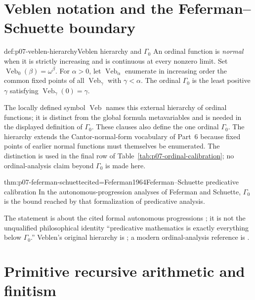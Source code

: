 \section{Veblen notation and the Feferman--Schuette boundary}
\label{sec:p07-veblen}

\begin{hbdefinition}{def:p07-veblen-hierarchy}{Veblen hierarchy and \(\Gamma_0\)}
An ordinal function is \emph{normal} when it is strictly increasing and is
continuous at every nonzero limit.  Set
\(\operatorname{Veb}_0(\beta)=\omega^\beta\).  For \(\alpha>0\), let
\(\operatorname{Veb}_\alpha\) enumerate in increasing order the common fixed
points of all \(\operatorname{Veb}_\gamma\) with \(\gamma<\alpha\).  The
ordinal \(\Gamma_0\) is
the least positive \(\gamma\) satisfying
\(\operatorname{Veb}_\gamma(0)=\gamma\).

The locally defined symbol \(\operatorname{Veb}\) names this external
hierarchy of ordinal functions; it is distinct from the global formula
metavariables and is needed in the displayed definition of \(\Gamma_0\).
These clauses also define the one ordinal \(\Gamma_0\).  The hierarchy extends
the Cantor-normal-form vocabulary of Part~6 because
fixed points of earlier normal functions must themselves be enumerated.  The
distinction is used in the final row of
Table~\ref{tab:p07-ordinal-calibration}; no ordinal-analysis claim beyond
\(\Gamma_0\) is made here.
\end{hbdefinition}

\begin{hbtheorem}{thm:p07-feferman-schuette}{cited=Feferman1964}{Feferman--Schuette predicative calibration}
In the autonomous-progression analyses of Feferman and Schuette,
\(\Gamma_0\) is the bound reached by that formalization of predicative
analysis.
\end{hbtheorem}

The statement is about the cited formal autonomous progressions
\cite{Feferman1964,Schuette1977}; it is not the unqualified philosophical
identity ``predicative mathematics is exactly everything below
\(\Gamma_0\).''  Veblen's original hierarchy is \cite{Veblen1908}; a modern
ordinal-analysis reference is \cite{Pohlers2009}.

\section{Primitive recursive arithmetic and finitism}
\label{sec:p07-pra-finitism}

